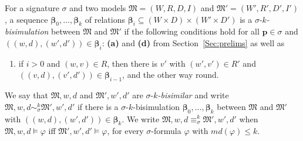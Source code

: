 \documentclass{lmcs} %
\theoremstyle{plain}\newtheorem{satz}[thm]{Satz} %
\newtheorem{lemma}[theorem]{Lemma}
\newcommand{\nz}[1]{\textcolor{blue}{\bf!}%
	\marginpar[\parbox{15mm}{\raggedleft\scriptsize\textcolor{blue}{#1}}]%
	{\parbox{15mm}{\raggedright\scriptsize\textcolor{blue}{#1}}}}
\newcommand{\md}{\textit{md}}
\newcommand{\bs}{\boldsymbol{\beta}}
\newcommand{\fform}[1]{\boldsymbol{#1}}
\newcommand{\pvar}{\fform{p}}
\begin{document}
For a signature $\sigma$ and two models $\mathfrak{M}= (W,R,D,I)$ and $\mathfrak{M}'= (W',R',D',I')$, a sequence $\bs_{0},\dots,\bs_{k}$ of relations  
%
$
\bs_{i} \subseteq (W\times D) \times (W'\times D')
$
%
is a $\sigma$-\emph{$k$-bisimulation} between $\mathfrak M$ and $\mathfrak M'$ if the following conditions hold for all $\pvar \in \sigma$ and  $((w,d),(w',d'))\in \bs_{i}$: {\bf (a)} and {\bf (d)} from Section~\ref{Sec:prelims} as well as
%
\begin{enumerate}[style=multiline,leftmargin=0.9cm]
	
\item[\textbf{(w$'$)}] if $i>0$ and $(w,v)\in R$, then there is $v'$ with  \mbox{$(w',v')\in R'$} and $((v,d),(v',d'))\in \bs_{i-1}$, and the other way round.
	
\end{enumerate}
%
We say that $\mathfrak{M},w,d$ and $\mathfrak{M}',w',d'$ are $\sigma$-\emph{$k$-bisimilar} and write 
%
$\mathfrak{M},w,d  \sim_{\sigma}^{k} \mathfrak{M}',w',d'$
%
if there is a $\sigma$-$k$-bisimulation $\bs_{0},\dots,\bs_{k}$ between $\mathfrak{M}$ and $\mathfrak{M}'$  with $((w,d),(w',d')) \in \bs_{k}$. We write
$\mathfrak{M},w,d  \equiv_{\sigma}^{k} \mathfrak{M}',w',d'$ when 
$\mathfrak{M},w, d \models \varphi$ iff $\mathfrak{M}',w', d'\models \varphi$, for every $\sigma$-formula $\varphi$ with $\md(\varphi)\leq k$.
%

\end{document}
